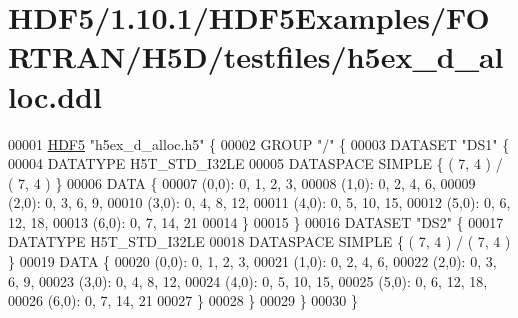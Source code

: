 \hypertarget{_h_d_f5_21_810_81_2_h_d_f5_examples_2_f_o_r_t_r_a_n_2_h5_d_2testfiles_2h5ex__d__alloc_8ddl_source}{}\section{H\+D\+F5/1.10.1/\+H\+D\+F5\+Examples/\+F\+O\+R\+T\+R\+A\+N/\+H5\+D/testfiles/h5ex\+\_\+d\+\_\+alloc.ddl}
\label{_h_d_f5_21_810_81_2_h_d_f5_examples_2_f_o_r_t_r_a_n_2_h5_d_2testfiles_2h5ex__d__alloc_8ddl_source}

\begin{DoxyCode}
00001 \hyperlink{namespace_h_d_f5}{HDF5} \textcolor{stringliteral}{"h5ex\_d\_alloc.h5"} \{
00002 GROUP \textcolor{stringliteral}{"/"} \{
00003    DATASET \textcolor{stringliteral}{"DS1"} \{
00004       DATATYPE  H5T\_STD\_I32LE
00005       DATASPACE  SIMPLE \{ ( 7, 4 ) / ( 7, 4 ) \}
00006       DATA \{
00007       (0,0): 0, 1, 2, 3,
00008       (1,0): 0, 2, 4, 6,
00009       (2,0): 0, 3, 6, 9,
00010       (3,0): 0, 4, 8, 12,
00011       (4,0): 0, 5, 10, 15,
00012       (5,0): 0, 6, 12, 18,
00013       (6,0): 0, 7, 14, 21
00014       \}
00015    \}
00016    DATASET \textcolor{stringliteral}{"DS2"} \{
00017       DATATYPE  H5T\_STD\_I32LE
00018       DATASPACE  SIMPLE \{ ( 7, 4 ) / ( 7, 4 ) \}
00019       DATA \{
00020       (0,0): 0, 1, 2, 3,
00021       (1,0): 0, 2, 4, 6,
00022       (2,0): 0, 3, 6, 9,
00023       (3,0): 0, 4, 8, 12,
00024       (4,0): 0, 5, 10, 15,
00025       (5,0): 0, 6, 12, 18,
00026       (6,0): 0, 7, 14, 21
00027       \}
00028    \}
00029 \}
00030 \}
\end{DoxyCode}
